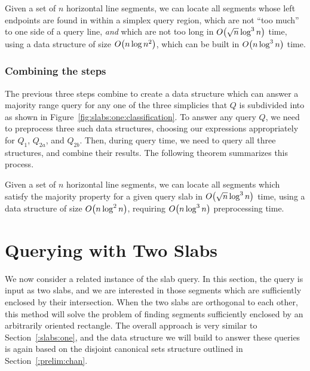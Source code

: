 \begin{lemma}
\label{lem:slabs:one:step3}
Given a set of $n$ horizontal line segments, we can locate all segments whose left endpoints are found in within a simplex query region, which are not ``too much'' to one side of a query line, \emph{and} which are not too long in $O\!\left(\sqrt{n}\log^3{n}\right)$ time, using a data structure of size $O\!\left(n\log{n}^2\right)$, which can be built in $O\!\left(n\log^3{n}\right)$ time.
\end{lemma}

\subsubsection{Combining the steps}

The previous three steps combine to create a data structure which can answer a majority range query for any one of the three simplicies that $Q$ is subdivided into as shown in Figure~\ref{fig:slabs:one:classification}.  To answer any query $Q$, we need to preprocess three such data structures, choosing our expressions appropriately for $Q_1$, $Q_{2a}$, and $Q_{2b}$.  Then, during query time, we need to query all three structures, and combine their results. The following theorem summarizes this process.

\begin{theorem}
\label{thm:slabs:one}
Given a set of $n$ horizontal line segments, we can locate all segments which satisfy the majority property for a given query slab in $O\!\left(\sqrt{n}\log^3{n}\right)$ time, using a data structure of size $O\!\left(n\log^2{n}\right)$, requiring $O\!\left(n\log^3{n}\right)$ preprocessing time.
\end{theorem}


\section{Querying with Two Slabs}
\label{:slabs:two}

We now consider a related instance of the slab query. In this section, the query is input as two slabs, and we are interested in those segments which are sufficiently enclosed by their intersection. When the two slabs are orthogonal to each other, this method will solve the problem of finding segments sufficiently enclosed by an arbitrarily oriented rectangle.  The overall approach is very similar to Section~\ref{:slabs:one}, and the data structure we will build to answer these queries is again based on the disjoint canonical sets structure outlined in Section~\ref{:prelim:chan}.


